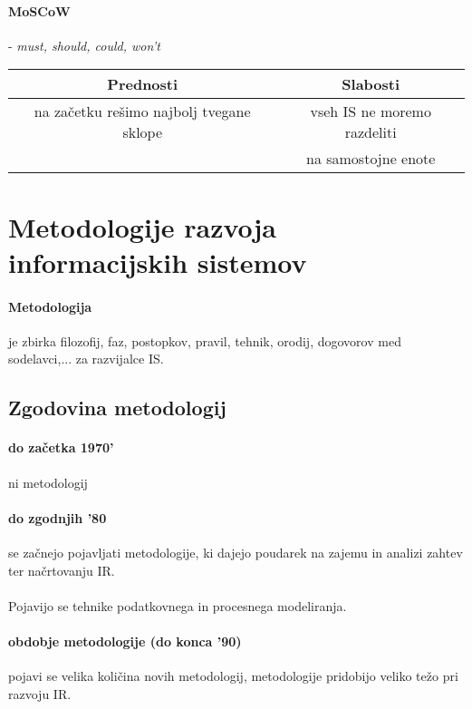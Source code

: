 \documentclass[a4paper,12pt]{report}
\begin{document}
   \paragraph{MoSCoW} - \textit{must, should, could, won't}

   \begin{center}
      \begin{tabular}{|c||c|}
         \hline
         \textbf{Prednosti} & \textbf{Slabosti}\\
         \hline
         na začetku rešimo najbolj tvegane sklope & vseh IS ne moremo razdeliti\\& na samostojne enote\\
         \hline
      \end{tabular}
   \end{center}

   
   
   \section{Metodologije razvoja informacijskih sistemov}
   
   \paragraph{Metodologija} je zbirka filozofij, faz, postopkov, pravil, tehnik, orodij, dogovorov med sodelavci,... za razvijalce IS.

   \subsection{Zgodovina metodologij}
   \paragraph{do začetka 1970'} ni metodologij
   
   \paragraph{do zgodnjih '80} se začnejo pojavljati metodologije, ki dajejo poudarek na zajemu in analizi zahtev ter načrtovanju IR. 
   \\\\Pojavijo se tehnike podatkovnega in procesnega modeliranja.

   \paragraph{obdobje metodologije (do konca '90)} pojavi se velika količina novih metodologij, metodologije pridobijo veliko težo pri razvoju IR.
\end{document}
